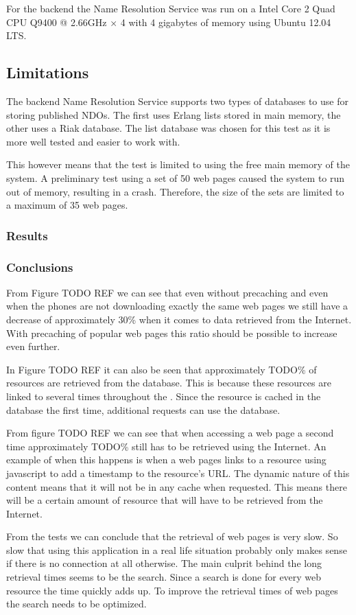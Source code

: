 For the backend the Name Resolution Service was run on a Intel Core 2 Quad CPU Q9400 @ 2.66GHz × 4 with 4 gigabytes of memory using Ubuntu 12.04 LTS.

\subsection{Limitations}

The backend Name Resolution Service supports two types of databases to use for storing published NDOs. The first uses Erlang lists stored in main memory, the other uses a Riak database. The list database was chosen for this test as it is more well tested and easier to work with.

This however means that the test is limited to using the free main memory of the system. A preliminary test using a set of 50 web pages caused the system to run out of memory, resulting in a crash. Therefore, the size of the sets are limited to a maximum of 35 web pages.

\subsubsection{Results}



\subsubsection{Conclusions}

From Figure TODO REF we can see that even without precaching and even when the phones are not downloading exactly the same web pages we still have a decrease of approximately 30\% when it comes to data retrieved from the Internet. With precaching of popular web pages this ratio should be possible to increase even further.

In Figure TODO REF it can also be seen that approximately TODO\% of resources are retrieved from the database. This is because these resources are linked to several times throughout the . Since the resource is cached in the database the first time, additional requests can use the database.

From figure TODO REF we can see that when accessing a web page a second time approximately TODO\% still has to be retrieved using the Internet. An example of when this happens is when a web pages links to a resource using javascript to add a timestamp to the resource's URL. The dynamic nature of this content means that it will not be in any cache when requested. This means there will be a certain amount of resource that will have to be retrieved from the Internet.

From the tests we can conclude that the retrieval of web pages is very slow. So slow that using this application in a real life situation probably only makes sense if there is no connection at all otherwise. The main culprit behind the long retrieval times seems to be the search. Since a search is done for every web resource the time quickly adds up. To improve the retrieval times of web pages the search needs to be optimized.